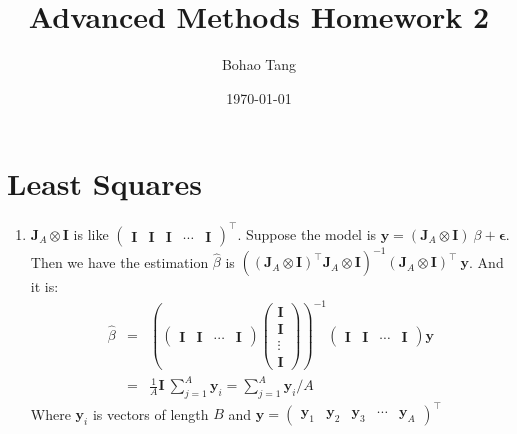 \documentclass[12pt]{article}
\title{Advanced Methods Homework 2}
\date{\today}
\author{Bohao Tang}
\newcommand{\ttt}[1]{\textbf{#1}}
\begin{document}


\maketitle

\section{Least Squares}
\begin{enumerate}
    \item
    $\ttt{J}_A \otimes \ttt{I}$ is like 
    $\begin{pmatrix}
        \ttt{I} & \ttt{I} & \ttt{I} & \cdots & \ttt{I}
    \end{pmatrix}^\top$.
    Suppose the model is $\ttt{y} = (\ttt{J}_A \otimes \ttt{I})\ \beta + \bm{\epsilon}$. 
    Then we have the estimation $\hat{\beta}$ is $((\ttt{J}_A\otimes\ttt{I})^\top \ttt{J}_A \otimes \ttt{I})^{-1} (\ttt{J}_A \otimes \ttt{I})^\top \ \ttt{y}$. And it is:
    \begin{eqnarray}
        \hat{\beta} &=& \left( \begin{pmatrix} \ttt{I} & \ttt{I} & \cdots & \ttt{I} \end{pmatrix} \begin{pmatrix} \ttt{I} \\ \ttt{I} \\ \vdots \\ \ttt{I} \end{pmatrix} \right)^{-1} \begin{pmatrix} \ttt{I} & \ttt{I} & \cdots & \ttt{I} \end{pmatrix} \ttt{y} \\
                    &=& \frac{1}{A} \ttt{I}\ \sum_{j=1}^{A} \ttt{y}_i = \sum_{j=1}^{A} \ttt{y}_i / A
    \end{eqnarray}
    Where $\ttt{y}_i$ is vectors of length $B$ and $\ttt{y} = \begin{pmatrix}
                                                                    \ttt{y}_1 & \ttt{y}_2 & \ttt{y}_3 & \cdots & \ttt{y}_A
                                                              \end{pmatrix}^\top$
    

\end{enumerate}
\end{document}
